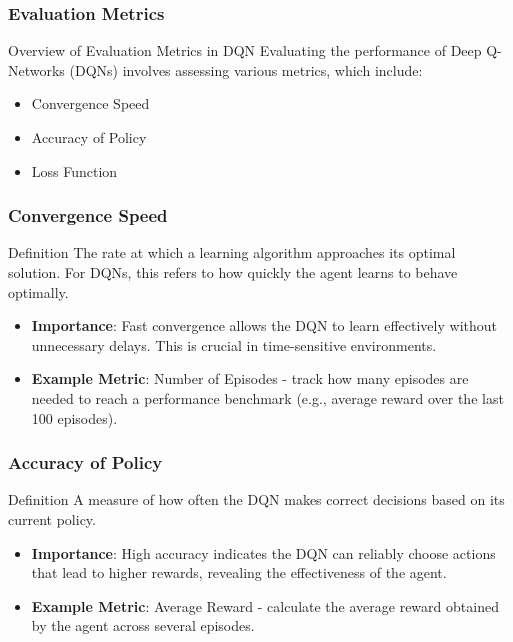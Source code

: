 \documentclass[aspectratio=169]{beamer}
\begin{document}
\begin{frame}
    \frametitle{Evaluation Metrics}
    \begin{block}{Overview of Evaluation Metrics in DQN}
        Evaluating the performance of Deep Q-Networks (DQNs) involves assessing various metrics, which include:
        \begin{itemize}
            \item Convergence Speed
            \item Accuracy of Policy
            \item Loss Function
        \end{itemize}
    \end{block}
\end{frame}

\begin{frame}
    \frametitle{Convergence Speed}
    \begin{block}{Definition}
        The rate at which a learning algorithm approaches its optimal solution. For DQNs, this refers to how quickly the agent learns to behave optimally.
    \end{block}
    \begin{itemize}
        \item \textbf{Importance}: Fast convergence allows the DQN to learn effectively without unnecessary delays. This is crucial in time-sensitive environments.
        \item \textbf{Example Metric}: Number of Episodes - track how many episodes are needed to reach a performance benchmark (e.g., average reward over the last 100 episodes).
    \end{itemize}
\end{frame}

\begin{frame}
    \frametitle{Accuracy of Policy}
    \begin{block}{Definition}
        A measure of how often the DQN makes correct decisions based on its current policy.
    \end{block}
    \begin{itemize}
        \item \textbf{Importance}: High accuracy indicates the DQN can reliably choose actions that lead to higher rewards, revealing the effectiveness of the agent.
        \item \textbf{Example Metric}: Average Reward - calculate the average reward obtained by the agent across several episodes.
    \end{itemize}
\end{frame}
\end{document}
